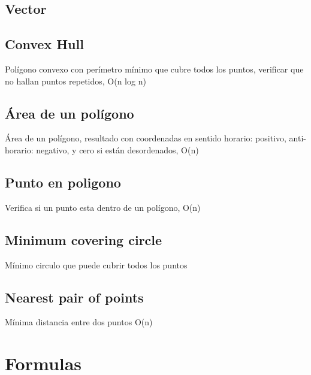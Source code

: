 \documentclass[10pt,landscape,twocolumn,letterpaper,twosided]{article}
\newcommand\cppfile[2][]{

}
\begin{document}
			\subsection{Vector}
			\cppfile[39-66]{geometria/vector.cpp}
			\subsection{Convex Hull}
			Polígono convexo con perímetro mínimo que cubre todos los puntos, verificar que no hallan puntos 
			repetidos, O(n log n)
			\cppfile[48-79]{geometria/convex_hull.cpp}
			\subsection{Área de un polígono}
			Área de un polígono, resultado con coordenadas en sentido horario: positivo, anti-horario: negativo, 
			y cero si están desordenados, O(n)
			\cppfile[59-67]{geometria/poligono.cpp}
			\subsection{Punto en poligono}
			Verifica si un punto esta dentro de un polígono, O(n)
			\cppfile[80-104]{geometria/poligono.cpp}
			\subsection{Minimum covering circle}
			Mínimo circulo que puede cubrir todos los puntos
			\cppfile[20-60]{geometria/minimum_covering_circle.cpp}
			\subsection{Nearest pair of points}
			Mínima distancia entre dos puntos O(n)
			\cppfile[18-67]{geometria/nearestPairPoints.cpp}
	
	\section{Formulas}
\end{document}
